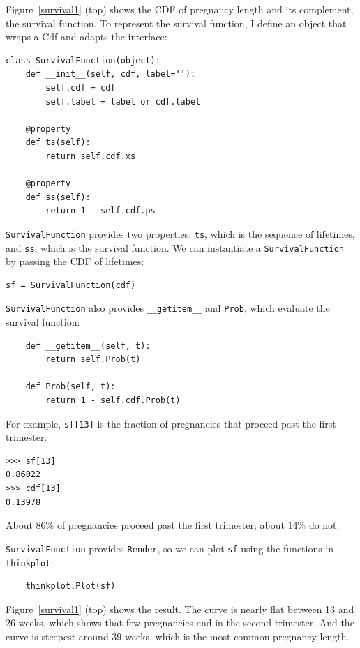 \documentclass[12pt]{book}
\begin{document}
Figure~\ref{survival1} (top) shows the CDF of pregnancy length
and its complement, the survival function.  To represent the
survival function, I define an object that wraps a Cdf and 
adapts the interface:

\begin{verbatim}
class SurvivalFunction(object):
    def __init__(self, cdf, label=''):
        self.cdf = cdf
        self.label = label or cdf.label

    @property
    def ts(self):
        return self.cdf.xs

    @property
    def ss(self):
        return 1 - self.cdf.ps
\end{verbatim}

{\tt SurvivalFunction} provides two properties: {\tt ts}, which
is the sequence of lifetimes, and {\tt ss}, which is the survival
function.  We can instantiate a {\tt SurvivalFunction} by passing
the CDF of lifetimes:

\begin{verbatim}
sf = SurvivalFunction(cdf)
\end{verbatim}

{\tt SurvivalFunction} also provides \verb"__getitem__" and
{\tt Prob}, which evaluate the survival function:

\begin{verbatim}
    def __getitem__(self, t):
        return self.Prob(t)

    def Prob(self, t):
        return 1 - self.cdf.Prob(t)
\end{verbatim}

For example, {\tt sf[13]} is the fraction of pregnancies that
proceed past the first trimester:

\begin{verbatim}
>>> sf[13]
0.86022
>>> cdf[13]
0.13978
\end{verbatim}

About 86\% of pregnancies proceed past the first trimester;
about 14\% do not.

{\tt SurvivalFunction} provides {\tt Render}, so we can
plot {\tt sf} using the functions in {\tt thinkplot}:

\begin{verbatim}
    thinkplot.Plot(sf)
\end{verbatim}

Figure~\ref{survival1} (top) shows the result.  The curve is nearly
flat between 13 and 26 weeks, which shows that few pregnancies
end in the second trimester.  And the curve is steepest around 39
weeks, which is the most common pregnancy length.
\end{document}
